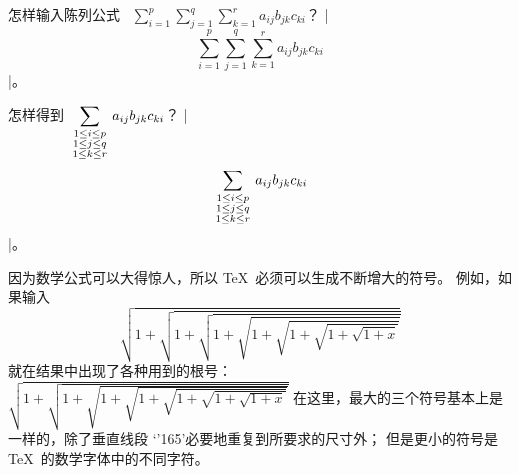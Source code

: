 \exercise 怎样输入陈列公式
~$\displaystyle
\sum_{i=1}^p\sum_{j=1}^q\sum_{k=1}^ra_{ij}b_{jk}c_{ki}$\enspace ？
\answer |$$\sum_{i=1}^p\sum_{j=1}^q\sum_{k=1}^ra_{ij}b_{jk}c_{ki}$$|。

\dangerexercise 怎样得到 $\displaystyle
\sum_{{\scriptstyle1\le i\le p\atop\scriptstyle1\le j\le q}
    \atop\scriptstyle1\le k\le r}a_{ij}b_{jk}c_{ki}$\enspace ？
\answer |$$\sum_{{\scriptstyle 1\le i\le p \atop \scriptstyle 1\le j\le q}
    \atop \scriptstyle 1\le k\le r} a_{ij} b_{jk} c_{ki}$$|。

因为数学公式可以大得惊人，所以 \TeX\ 必须可以生成不断增大的符号。%
例如，如果输入
\begintt
$$\sqrt{1+\sqrt{1+\sqrt{1+
            \sqrt{1+\sqrt{1+\sqrt{1+\sqrt{1+x}}}}}}}$$
\endtt
就在结果中出现了各种用到的根号：
\begindisplay
$\displaystyle\sqrt{1+\sqrt{1+\sqrt{1+
            \sqrt{1+\sqrt{1+\sqrt{1+\sqrt{1+x}}}}}}}$
\enddisplay
在这里，最大的三个符号基本上是一样的，除了垂直线段%
`\vbox{\hbox{\tenex\char'165}\vss}'必要地重复到所要求的尺寸外；
但是更小的符号是 \TeX\ 的数学字体中的不同字符。

